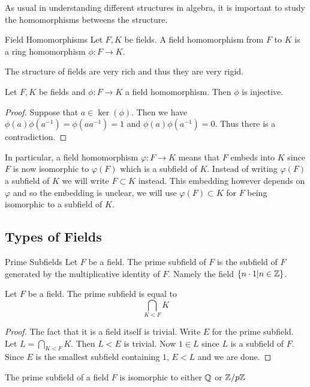 \documentclass[a4paper]{article}
\begin{document}
As usual in understanding different structures in algebra, it is important to study the homomorphisms betweens the structure. 

\begin{defn}{Field Homomorphisms}{} Let $F,K$ be fields. A field homomorphism from $F$ to $K$ is a ring homomorphism $\phi:F\to K$. 
\end{defn}

The structure of fields are very rich and thus they are very rigid. 

\begin{lmm}{}{} Let $F,K$ be fields and $\phi:F\to K$ a field homomorphism. Then $\phi$ is injective. \tcbline
\begin{proof}
Suppose that $a\in\ker(\phi)$. Then we have $\phi(a)\phi(a^{-1})=\phi(aa^{-1})=1$ and $\phi(a)\phi(a^{-1})=0$. Thus there is a contradiction. 
\end{proof}
\end{lmm}

In particular, a field homomorphism $\varphi:F\to K$ means that $F$ embeds into $K$ since $F$ is now isomorphic to $\varphi(F)$ which is a subfield of $K$. Instead of writing $\varphi(F)$ a subfield of $K$ we will write $F\subset K$ instead. This embedding however depends on $\varphi$ and so the embedding is unclear, we will use $\varphi(F)\subset K$ for $F$ being isomorphic to a subfield of $K$. 

\subsection{Types of Fields}
\begin{defn}{Prime Subfields}{} Let $F$ be a field. The prime subfield of $F$ is the subfield of $F$ generated by the multiplicative identity of $F$. Namely the field $\{n\cdot 1|n\in\mathbb{Z}\}$. 
\end{defn}

\begin{prp}{}{} Let $F$ be a field. The prime subfield is equal to $$\bigcap_{K<F}K$$ \tcbline
\begin{proof}
The fact that it is a field itself is trivial. Write $E$ for the prime subfield. Let $L=\bigcap_{K<F}K$.  Then $L<E$ is trivial. Now $1\in L$ since $L$ is a subfield of $F$. Since $E$ is the smallest subfield containing $1$, $E<L$ and we are done. 
\end{proof}
\end{prp}

\begin{prp}{}{} The prime subfield of a field $F$ is isomorphic to either $\mathbb{Q}$ or $\mathbb{Z}/p\mathbb{Z}$
\end{prp}
\end{document}

